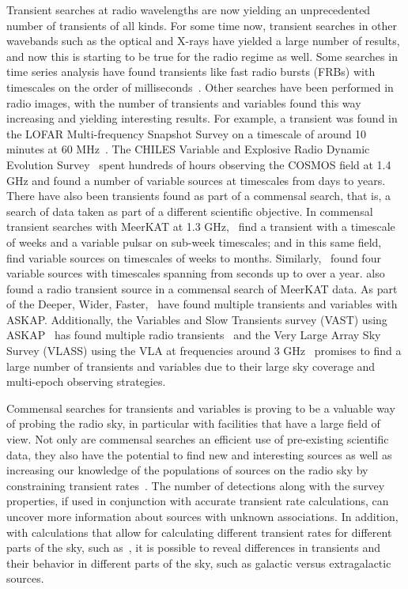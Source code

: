 \documentclass[12pt]{article}
\begin{document}
Transient searches at radio wavelengths are now yielding an unprecedented number of transients of all kinds. For some time now, transient searches in other wavebands such as the optical and X-rays have yielded a large number of results, and now this is starting to be true for the radio regime as well. Some searches in time series analysis have found transients like fast radio bursts (FRBs) with timescales on the order of milliseconds~\citep[e.g.,][]{2007Sci...318..777L,2021ApJS..257...59C}. Other searches have been performed in radio images, with the number of transients and variables found this way increasing and yielding interesting results. For example, a transient was found in the LOFAR Multi-frequency Snapshot Survey on a timescale of around 10 minutes at 60 MHz~\citep{2016MNRAS.456.2321S}. The CHILES Variable and Explosive Radio Dynamic Evolution Survey~\citep{2021ApJ...923...31S} spent hundreds of hours observing the COSMOS field at 1.4 GHz and found a number of variable sources at timescales from days to years. There have also been transients found as part of a commensal search, that is, a search of data taken as part of a different scientific objective. In commensal transient searches with MeerKAT at 1.3 GHz,~\citet{2020MNRAS.491..560D} find a transient with a timescale of weeks and a variable pulsar on sub-week timescales; and in this same field,~\citet{2022MNRAS.512.5037D} find variable sources on timescales of weeks to months. Similarly,~\citet{2022MNRAS.517.2894R} found four variable sources with timescales spanning from seconds up to over a year. \citet{2022MNRAS.513.3482A} also found a radio transient source in a commensal search of MeerKAT data. As part of the Deeper, Wider, Faster,~\citet{2023MNRAS.519.4684D} have found multiple transients and variables with ASKAP. Additionally, the Variables and Slow Transients survey (VAST) using ASKAP~\citep{2021PASA...38...54M} has found multiple radio transients~\citep{2021ApJ...920...45W,2022MNRAS.516.5972W} and the Very Large Array Sky Survey (VLASS) using the VLA at frequencies around 3 GHz~\citep{2020PASP..132c5001L} promises to find a large number of transients and variables due to their large sky coverage and multi-epoch observing strategies. 

Commensal searches for transients and variables is proving to be a valuable way of probing the radio sky, in particular with facilities that have a large field of view. Not only are commensal searches an efficient use of pre-existing scientific data, they also have the potential to find new and interesting sources as well as increasing our knowledge of the populations of sources on the radio sky by constraining transient rates~\citep[e.g.,][]{2011ApJ...728L..14B,2016MNRAS.459.3161C}. The number of detections along with the survey properties, if used in conjunction with accurate transient rate calculations, can uncover more information about sources with unknown associations. In addition, with calculations that allow for calculating different transient rates for different parts of the sky, such as~\citep{2022ascl.soft04007C}, it is possible to reveal differences in transients and their behavior in different parts of the sky, such as galactic versus extragalactic sources. 
\end{document}
